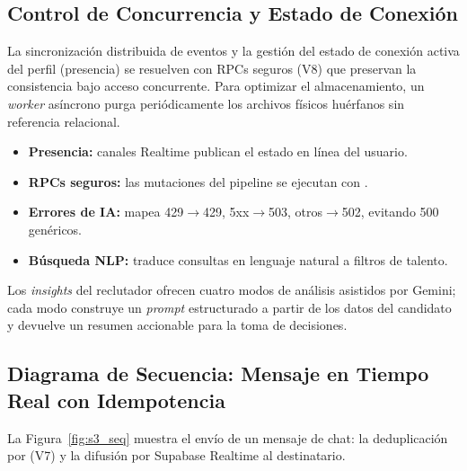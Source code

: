\subsection{Control de Concurrencia y Estado de Conexión}
\label{ssec:s3_be_concurrencia}
La sincronización distribuida de eventos y la gestión del estado de conexión activa del perfil
(presencia) se resuelven con RPCs seguros (V8) que preservan la consistencia bajo acceso
concurrente. Para optimizar el almacenamiento, un \textit{worker} asíncrono purga periódicamente
los archivos físicos huérfanos sin referencia relacional.

\begin{itemize}[noitemsep]
    \item \textbf{Presencia:} canales Realtime publican el estado en línea del usuario.
    \item \textbf{RPCs seguros:} las mutaciones del pipeline se ejecutan con .
    \item \textbf{Errores de IA:}  mapea 429$\to$429, 5xx$\to$503,
    otros$\to$502, evitando 500 genéricos.
    \item \textbf{Búsqueda NLP:}  traduce consultas en lenguaje
    natural a filtros de talento.
\end{itemize}

\begin{NotaTecnica}
Los \textit{insights} del reclutador ofrecen cuatro modos de análisis asistidos por Gemini; cada
modo construye un \textit{prompt} estructurado a partir de los datos del candidato y devuelve un
resumen accionable para la toma de decisiones.
\end{NotaTecnica}

\subsection{Diagrama de Secuencia: Mensaje en Tiempo Real con Idempotencia}
\label{ssec:s3_seq_chat}
La Figura~\ref{fig:s3_seq} muestra el envío de un mensaje de chat: la deduplicación por
 (V7) y la difusión por Supabase Realtime al destinatario.

